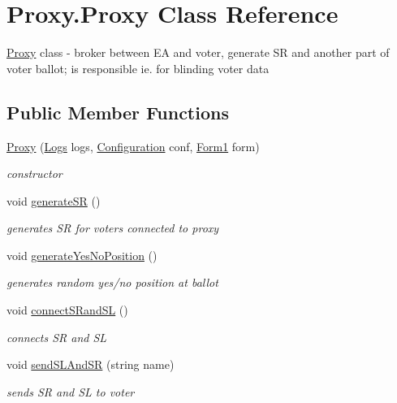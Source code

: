 \hypertarget{class_proxy_1_1_proxy}{}\section{Proxy.\+Proxy Class Reference}
\label{class_proxy_1_1_proxy}


\hyperlink{class_proxy_1_1_proxy}{Proxy} class -\/ broker between E\+A and voter, generate S\+R and another part of voter ballot; is responsible ie. for blinding voter data  


\subsection*{Public Member Functions}
\begin{DoxyCompactItemize}
\item 
\hyperlink{class_proxy_1_1_proxy_a1ba219e1808147ee5c4cd9348a750009}{Proxy} (\hyperlink{class_proxy_1_1_logs}{Logs} logs, \hyperlink{class_proxy_1_1_configuration}{Configuration} conf, \hyperlink{class_proxy_1_1_form1}{Form1} form)
\begin{DoxyCompactList}\small\item\em constructor \end{DoxyCompactList}\item 
void \hyperlink{class_proxy_1_1_proxy_af71ea01ac63739f90d6a9651de00d885}{generate\+S\+R} ()
\begin{DoxyCompactList}\small\item\em generates S\+R for voters connected to proxy \end{DoxyCompactList}\item 
void \hyperlink{class_proxy_1_1_proxy_a0ea3bfa4ca0b831656a33fdf42f2c812}{generate\+Yes\+No\+Position} ()
\begin{DoxyCompactList}\small\item\em generates random yes/no position at ballot \end{DoxyCompactList}\item 
void \hyperlink{class_proxy_1_1_proxy_a980f5d8980fc91b872554a596e63ac28}{connect\+S\+Rand\+S\+L} ()
\begin{DoxyCompactList}\small\item\em connects S\+R and S\+L \end{DoxyCompactList}\item 
void \hyperlink{class_proxy_1_1_proxy_ae7257065c6d0e65c58bfe8b1de8a4a96}{send\+S\+L\+And\+S\+R} (string name)
\begin{DoxyCompactList}\small\item\em sends S\+R and S\+L to voter \end{DoxyCompactList}\item 

\end{DoxyCompactItemize}
